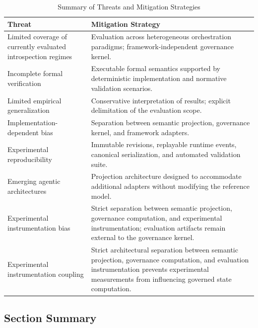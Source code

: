 \documentclass[10pt]{article}
\begin{document}
\begin{table}[t]
\caption{Summary of Threats and Mitigation Strategies}
\label{tab:mitigation_strategies}
\centering
\begin{tabular}{p{4.2cm}p{3.9cm}}
\toprule
\textbf{Threat} & \textbf{Mitigation Strategy} \\
\midrule
Limited coverage of currently evaluated introspection regimes &
Evaluation across heterogeneous orchestration paradigms; framework-independent governance kernel. \\

Incomplete formal verification &
Executable formal semantics supported by deterministic implementation and normative validation scenarios. \\

Limited empirical generalization &
Conservative interpretation of results; explicit delimitation of the evaluation scope. \\

Implementation-dependent bias &
Separation between semantic projection, governance kernel, and framework adapters. \\

Experimental reproducibility &
Immutable revisions, replayable runtime events, canonical serialization, and automated validation suite. \\

Emerging agentic architectures &
Projection architecture designed to accommodate additional adapters without modifying the reference model. \\

Experimental instrumentation bias &
Strict separation between semantic projection, governance computation, and experimental instrumentation; evaluation artifacts remain external to the governance kernel. \\

Experimental instrumentation coupling &
Strict architectural separation between semantic projection, governance computation, and evaluation instrumentation prevents experimental measurements from influencing governed state computation. \\

\bottomrule
\end{tabular}
\end{table}

\subsection{Section Summary}
\label{sec:threats_summary}
\end{document}
